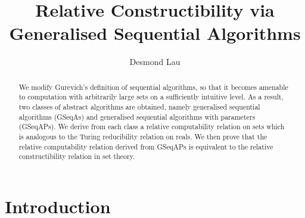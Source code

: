 \documentclass[12pt]{article}
\title{Relative Constructibility via Generalised Sequential Algorithms}
\author{Desmond Lau}
\numberwithin{equation}{section}
\begin{document}
\maketitle

\begin{abstract}
We modify Gurevich's definition of sequential algorithms, so that it becomes amenable to computation with arbitrarily large sets on a sufficiently intuitive level. As a result, two classes of abstract algorithms are obtained, namely generalised sequential algorithms (GSeqAs) and generalised sequential algorithms with parameters (GSeqAPs). We derive from each class a relative computability relation on sets which is analogous to the Turing reducibility relation on reals. We then prove that the relative computability relation derived from GSeqAPs is equivalent to the relative constructibility relation in set theory.
\end{abstract}

\newtheorem{thm}{Theorem}[section]
\newtheorem{innercustomlem}{Lemma}
\newenvironment{customlem}[1]
  {\renewcommand\theinnercustomlem{#1}\innercustomlem}
  {\endinnercustomlem}
\newtheorem{innercustomdef}{Definition}
\newenvironment{customdef}[1]
  {\renewcommand\theinnercustomdef{#1}\innercustomdef}
  {\endinnercustomdef}
\newtheorem{lem}[thm]{Lemma}
\newtheorem{prop}[thm]{Proposition}
\newtheorem{cor}[thm]{Corollary}
\newtheorem{conj}[thm]{Conjecture}
\newtheorem{ques}[thm]{Question}
\newtheorem*{claim}{Claim}
\theoremstyle{definition}
\newtheorem{defi}[thm]{Definition}
\theoremstyle{remark}
\newtheorem*{rem*}{Remark}
\newtheorem{rem}[thm]{Remark}
\newtheorem{ex}[thm]{Example}
\newtheorem{ob}[thm]{Observation}
\newtheorem{fact}[thm]{Fact}
\newtheorem{con}[thm]{Convention}
\newtheorem{diff}[thm]{Difficulty}

\newcommand{\bd}[1]{\mathbf{#1}}  %
\newcommand{\RR}{\mathbb{R}}      %
\newcommand{\ZZ}{\mathbb{Z}}      %
\newcommand{\col}[1]{\left[\begin{matrix} #1 \end{matrix} \right]}
\newcommand{\comb}[2]{\binom{#1^2 + #2^2}{#1+#2}}
\newcommand{\eq}{=}

\newcommand{\blankpage}{
\newpage
\thispagestyle{empty}
\mbox{}
\newpage
}

{\let\clearpage\relax \tableofcontents} 
\thispagestyle{empty}

\section{Introduction}\label{sect1}
\end{document}
